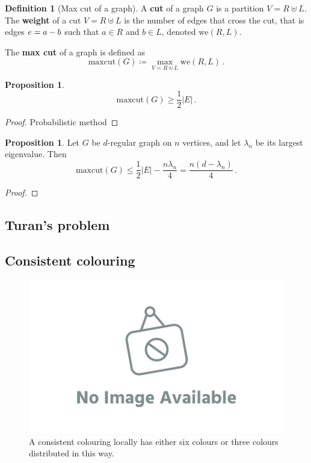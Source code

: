 \documentclass[12pt]{amsart}
\theoremstyle{definition}
\newtheorem{prop}[thm]{Proposition}
\newtheorem{defin}[thm]{Definition}
\newcommand{\maxcut}{\mathrm{maxcut}}
\newcommand{\we}{\mathrm{we}}
\begin{document}
\begin{defin}[Max cut of a graph]
A \textbf{cut} of a graph $G$ is a partition $V = R \uplus L$.
The \textbf{weight} of a cut $V = R \uplus L$ is the number of edges that cross the cut, that is edges $e = a \-- b$ such that $a \in R$ and $b \in L$, denoted $\we(R, L)$.

The \textbf{max cut} of a graph is defined as
$$ \maxcut (G) \coloneqq \max_{V = R \uplus L} \we(R, L) \, . $$
\end{defin}

\begin{prop}
$$\maxcut(G) \geq \frac{1}{2}|E| \, .$$
\end{prop}

\begin{proof}
Probabilistic method
\end{proof}


\begin{prop}
Let $G$ be $d$-regular graph on $n$ vertices, and let $\lambda_n$ be its largest eigenvalue.
Then 
$$\maxcut(G) \leq \frac{1}{2} |E| - \frac{n \lambda_n}{4} = \frac{n (d-\lambda_n)}{4} \, . $$
\end{prop}

\begin{proof}

\end{proof}

\subsection{Turan's problem}

\subsection{Consistent colouring}



\begin{figure}[h]
\includegraphics[scale=.1]{../imgs/ina.png}%
\caption{A consistent colouring locally has either six colours or three colours distributed in this way.\label{fig:consistent_colouring}}
\end{figure}
\end{document}
